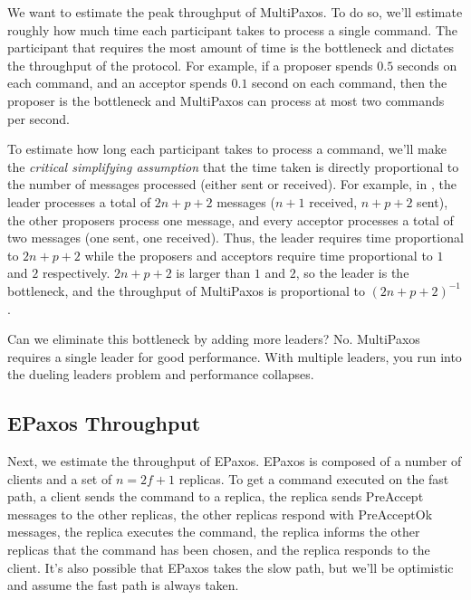 We want to estimate the peak throughput of MultiPaxos. To do so, we'll estimate
roughly how much time each participant takes to process a single command. The
participant that requires the most amount of time is the bottleneck and
dictates the throughput of the protocol. For example, if a proposer spends
$0.5$ seconds on each command, and an acceptor spends $0.1$ second on each
command, then the proposer is the bottleneck and MultiPaxos can process at most
two commands per second.

To estimate how long each participant takes to process a command, we'll make
the \emph{critical simplifying assumption} that the time taken is directly
proportional to the number of messages processed (either sent or received).
For example, in , the leader processes a total of $2n + p +
2$ messages ($n + 1$ received, $n + p + 2$ sent), the other proposers process
one message, and every acceptor processes a total of two messages (one sent,
one received). Thus, the leader requires time proportional to $2n + p + 2$
while the proposers and acceptors require time proportional to $1$ and $2$
respectively. $2n + p + 2$ is larger than $1$ and $2$, so the leader is the
bottleneck, and the throughput of MultiPaxos is proportional to $(2n + p +
2)^{-1}$.

Can we eliminate this bottleneck by adding more leaders? No. MultiPaxos
requires a single leader for good performance. With multiple leaders, you run
into the dueling leaders problem and performance collapses.

\subsection{EPaxos Throughput}
Next, we estimate the throughput of EPaxos. EPaxos is composed of a number of
clients and a set of $n = 2f + 1$ replicas. To get a command executed on the
fast path, a client sends the command to a replica, the replica sends PreAccept
messages to the other replicas, the other replicas respond with PreAcceptOk
messages, the replica executes the command, the replica informs the other
replicas that the command has been chosen, and the replica responds to the
client. It's also possible that EPaxos takes the slow path, but we'll be
optimistic and assume the fast path is always taken.


